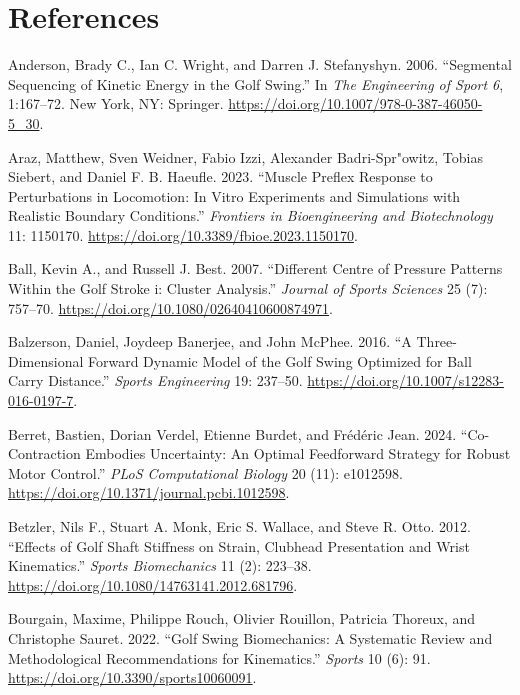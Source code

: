 \documentclass[
  letterpaper,
]{report}
\newlength{\cslhangindent}
\newenvironment{CSLReferences}[2] %
 {\begin{list}{}{%
  \setlength{\itemindent}{0pt}
  \setlength{\leftmargin}{0pt}
  \setlength{\parsep}{0pt}
  \ifodd #1
   \setlength{\leftmargin}{\cslhangindent}
   \setlength{\itemindent}{-1\cslhangindent}
  \fi
  \setlength{\itemsep}{#2\baselineskip}}}
 {\end{list}}
\begin{document}
\chapter*{References}\label{references}

\label{refs}
\begin{CSLReferences}{1}{0}
Anderson, Brady C., Ian C. Wright, and Darren J. Stefanyshyn. 2006.
{``Segmental Sequencing of Kinetic Energy in the Golf Swing.''} In
\emph{The Engineering of Sport 6}, 1:167--72. New York, NY: Springer.
\url{https://doi.org/10.1007/978-0-387-46050-5_30}.

Araz, Matthew, Sven Weidner, Fabio Izzi, Alexander Badri-Spr"owitz,
Tobias Siebert, and Daniel F. B. Haeufle. 2023. {``Muscle Preflex
Response to Perturbations in Locomotion: In Vitro Experiments and
Simulations with Realistic Boundary Conditions.''} \emph{Frontiers in
Bioengineering and Biotechnology} 11: 1150170.
\url{https://doi.org/10.3389/fbioe.2023.1150170}.

Ball, Kevin A., and Russell J. Best. 2007. {``Different Centre of
Pressure Patterns Within the Golf Stroke i: Cluster Analysis.''}
\emph{Journal of Sports Sciences} 25 (7): 757--70.
\url{https://doi.org/10.1080/02640410600874971}.

Balzerson, Daniel, Joydeep Banerjee, and John McPhee. 2016. {``A
Three-Dimensional Forward Dynamic Model of the Golf Swing Optimized for
Ball Carry Distance.''} \emph{Sports Engineering} 19: 237--50.
\url{https://doi.org/10.1007/s12283-016-0197-7}.

Berret, Bastien, Dorian Verdel, Etienne Burdet, and Frédéric Jean. 2024.
{``Co-Contraction Embodies Uncertainty: An Optimal Feedforward Strategy
for Robust Motor Control.''} \emph{PLoS Computational Biology} 20 (11):
e1012598. \url{https://doi.org/10.1371/journal.pcbi.1012598}.

Betzler, Nils F., Stuart A. Monk, Eric S. Wallace, and Steve R. Otto.
2012. {``Effects of Golf Shaft Stiffness on Strain, Clubhead
Presentation and Wrist Kinematics.''} \emph{Sports Biomechanics} 11 (2):
223--38. \url{https://doi.org/10.1080/14763141.2012.681796}.

Bourgain, Maxime, Philippe Rouch, Olivier Rouillon, Patricia Thoreux,
and Christophe Sauret. 2022. {``Golf Swing Biomechanics: A Systematic
Review and Methodological Recommendations for Kinematics.''}
\emph{Sports} 10 (6): 91. \url{https://doi.org/10.3390/sports10060091}.


\end{CSLReferences}
\end{document}
